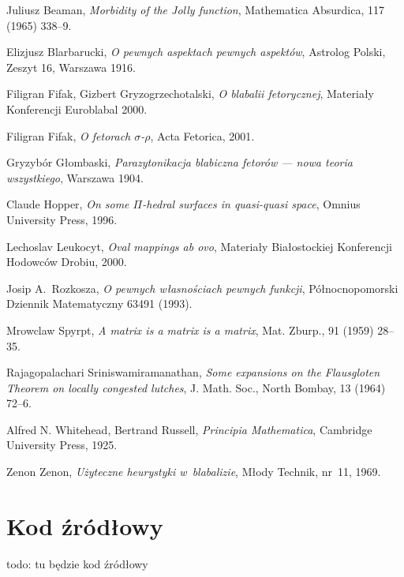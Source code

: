 \documentclass[licencjacka]{pracamgr}
\begin{document}
\begin{thebibliography}{99}

 Juliusz Beaman, \textit{Morbidity of the Jolly
    function}, Mathematica Absurdica, 117 (1965) 338--9.

 Elizjusz Blarbarucki, \textit{O pewnych
    aspektach pewnych aspektów}, Astrolog Polski, Zeszyt 16, Warszawa
  1916.

 Filigran Fifak, Gizbert Gryzogrzechotalski,
  \textit{O blabalii fetorycznej}, Materiały Konferencji Euroblabal
  2000.

 Filigran Fifak, \textit{O fetorach
    $\sigma$-$\rho$}, Acta Fetorica, 2001.

 Gryzybór Głombaski, \textit{Parazytonikacja
    blabiczna fetorów --- nowa teoria wszystkiego}, Warszawa 1904.

 Claude Hopper, \textit{On some $\Pi$-hedral
    surfaces in quasi-quasi space}, Omnius University Press, 1996.

 Lechoslav Leukocyt, \textit{Oval mappings ab ovo},
  Materiały Białostockiej Konferencji Hodowców Drobiu, 2000.

 Josip A.~Rozkosza, \textit{O pewnych własnościach
    pewnych funkcji}, Północnopomorski Dziennik Matematyczny 63491
  (1993).

 Mrowclaw Spyrpt, \textit{A matrix is a matrix
    is a matrix}, Mat. Zburp., 91 (1959) 28--35.

 Rajagopalachari Sriniswamiramanathan,
  \textit{Some expansions on the Flausgloten Theorem on locally
    congested lutches}, J. Math.  Soc., North Bombay, 13 (1964) 72--6.

 Alfred N. Whitehead, Bertrand Russell,
  \textit{Principia Mathematica}, Cambridge University Press, 1925.

 Zenon Zenon, \textit{Użyteczne heurystyki
    w~blabalizie}, Młody Technik, nr~11, 1969.

\end{thebibliography}

\chapter*{Kod źródłowy}

todo: tu będzie kod źródłowy
\end{document}
